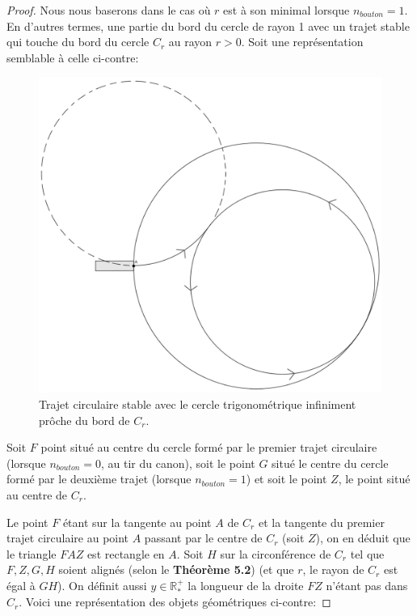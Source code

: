 \documentclass[a4paper]{amsart}
\theoremstyle{definition}
\theoremstyle{remark}
\numberwithin{equation}{section}
\begin{document}
\begin{proof}
  Nous nous baserons dans le cas où $r$ est à son minimal lorsque $n_{bouton}=1$. En d'autres termes, une partie du bord du cercle de rayon 1 avec un trajet stable qui touche du bord du cercle $C_r$ au rayon $r>0$. Soit une représentation
  semblable à celle ci-contre:

  \begin{figure}[H]
    \centering
    \includegraphics[scale=0.15]{images/perfect_inside.png}
    \caption{Trajet circulaire stable avec le cercle trigonométrique infiniment prôche du bord de $C_r$.}
  \end{figure}

  Soit $F$ point situé au centre du cercle formé par le premier trajet circulaire (lorsque $n_{bouton}=0$, au tir du canon), soit le point $G$ situé le centre
  du cercle formé par le deuxième trajet (lorsque $n_{bouton}=1$) et soit le point $Z$, le point situé au centre de $C_r$.

  Le point $F$ étant sur la tangente au point $A$ de $C_r$ et la tangente du premier trajet circulaire au point $A$ passant par le centre de $C_r$ (soit $Z$), on en déduit que
  le triangle $FAZ$ est rectangle en $A$. Soit $H$ sur la circonférence de $C_r$ tel que $F,Z,G,H$ soient alignés (selon le \textbf{Théorème 5.2}) (et que $r$, le rayon de $C_r$ est égal à $GH$). On définit aussi $y\in\mathbb{R^+_*}$ la longueur de la droite $FZ$ n'étant pas dans $C_r$. Voici une représentation des objets géométriques ci-contre:


\end{proof}
\end{document}
